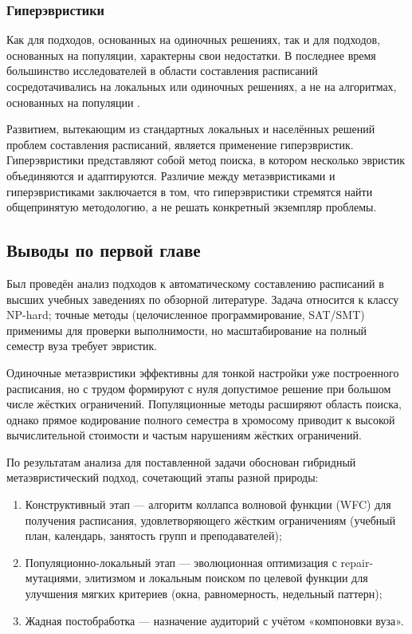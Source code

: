 \subsubsection{Гиперэвристики}

Как для подходов, основанных на одиночных решениях, так и для подходов, основанных на популяции, характерны свои недостатки. В последнее время большинство исследователей в области составления расписаний сосредотачивались на локальных или одиночных решениях, а не на алгоритмах, основанных на популяции \cite{albetar:harmony}.

Развитием, вытекающим из стандартных локальных и населённых решений проблем составления расписаний, является применение гиперэвристик. Гиперэвристики представляют собой метод поиска, в котором несколько эвристик объединяются и адаптируются. Различие между метаэвристиками и гиперэвристиками заключается в том, что гиперэвристики стремятся найти общепринятую методологию, а не решать конкретный экземпляр проблемы.

\subsection{Выводы по первой главе}

Был проведён анализ подходов к автоматическому составлению расписаний в высших учебных заведениях по обзорной литературе. Задача относится к классу NP-hard; точные методы (целочисленное программирование, SAT/SMT) применимы для проверки выполнимости, но масштабирование на полный семестр вуза требует эвристик.

Одиночные метаэвристики эффективны для тонкой настройки уже построенного расписания, но с трудом формируют с нуля допустимое решение при большом числе жёстких ограничений. Популяционные методы расширяют область поиска, однако прямое кодирование полного семестра в хромосому приводит к высокой вычислительной стоимости и частым нарушениям жёстких ограничений.

По результатам анализа для поставленной задачи обоснован гибридный метаэвристический подход, сочетающий этапы разной природы:
\begin{enumerate}
	\item Конструктивный этап --- алгоритм коллапса волновой функции (WFC) для получения расписания, удовлетворяющего жёстким ограничениям (учебный план, календарь, занятость групп и преподавателей);
	\item Популяционно-локальный этап --- эволюционная оптимизация с repair-мутациями, элитизмом и локальным поиском по целевой функции для улучшения мягких критериев (окна, равномерность, недельный паттерн);
	\item Жадная постобработка --- назначение аудиторий с учётом «компоновки вуза».
\end{enumerate}

